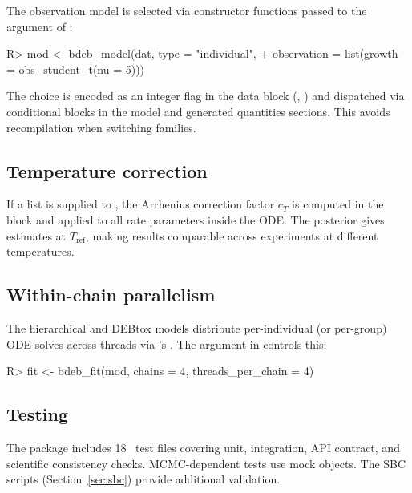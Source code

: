 \documentclass[article,shortnames]{jss}
\begin{document}
The observation model is selected via constructor functions passed to
the  argument of :
\begin{CodeChunk}
\begin{CodeInput}
R> mod <- bdeb_model(dat, type = "individual",
+    observation = list(growth = obs_student_t(nu = 5)))
\end{CodeInput}
\end{CodeChunk}
The choice is encoded as an integer flag in the  data
block (, ) and
dispatched via conditional blocks in the model and generated quantities
sections.  This avoids recompilation when switching families.

\subsection{Temperature correction} \label{sec:temp_impl}

If a  list is supplied to , the
Arrhenius correction factor $c_T$ is computed in the 
 block and applied to all rate parameters inside
the ODE.  The posterior gives estimates at $T_{\mathrm{ref}}$, making
results comparable across experiments at different temperatures.

\subsection{Within-chain parallelism} \label{sec:threading}

The hierarchical and DEBtox models distribute per-individual (or
per-group) ODE solves across threads via 's
.  The  argument in
 controls this:
\begin{CodeChunk}
\begin{CodeInput}
R> fit <- bdeb_fit(mod, chains = 4, threads_per_chain = 4)
\end{CodeInput}
\end{CodeChunk}

\subsection{Testing} \label{sec:testing}

The package includes 18~ test files covering unit,
integration, API contract, and scientific consistency checks.
MCMC-dependent tests use mock objects.  The SBC scripts
(Section~\ref{sec:sbc}) provide additional validation.
\end{document}
